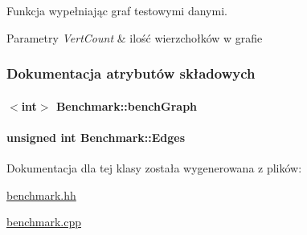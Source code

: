 Funkcja wypełniając graf testowymi danymi. 


\begin{DoxyParams}{Parametry}
{\em Vert\-Count} & ilość wierzchołków w grafie \\
\hline
\end{DoxyParams}


\subsubsection{Dokumentacja atrybutów składowych}
\hypertarget{class_benchmark_a94bdf26f3509801d37d3f06fa6c745d8}{
\paragraph[{bench\-Graph}]{$<$int$>$ Benchmark\-::bench\-Graph\hspace{0.3cm}{\ttfamily [private]}}}\label{class_benchmark_a94bdf26f3509801d37d3f06fa6c745d8}
\hypertarget{class_benchmark_afe068c6eb3c6971dd0d823deccc822fa}{
\paragraph[{Edges}]{\setlength{\rightskip}{0pt plus 5cm}unsigned int Benchmark\-::\-Edges\hspace{0.3cm}{\ttfamily [private]}}}\label{class_benchmark_afe068c6eb3c6971dd0d823deccc822fa}


Dokumentacja dla tej klasy została wygenerowana z plików\-:\begin{DoxyCompactItemize}
\item 
\hyperlink{benchmark_8hh}{benchmark.\-hh}\item 
\hyperlink{benchmark_8cpp}{benchmark.\-cpp}\end{DoxyCompactItemize}
